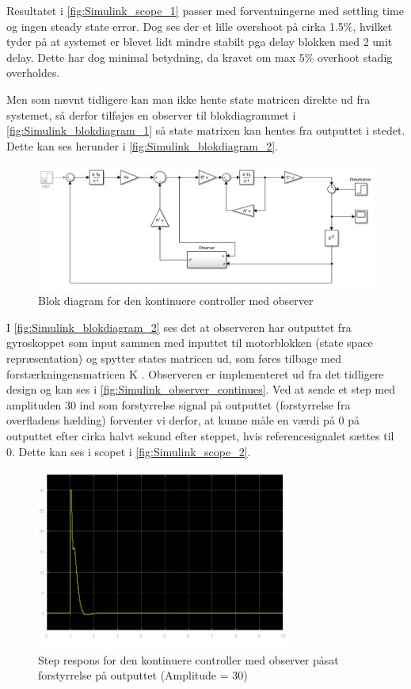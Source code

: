 Resultatet i \autoref{fig:Simulink_scope_1} passer med forventningerne med settling time og ingen steady state error. Dog ses der et lille overshoot på cirka 1.5\%, hvilket tyder på at systemet er blevet lidt mindre stabilt pga delay blokken med 2 unit delay. Dette har dog minimal betydning, da kravet om max 5\% overhoot stadig overholdes.

Men som nævnt tidligere kan man ikke hente state matricen direkte ud fra systemet, så derfor tilføjes en observer til blokdiagrammet i \autoref{fig:Simulink_blokdiagram_1} så state matrixen kan hentes fra outputtet i stedet. Dette kan ses herunder i \autoref{fig:Simulink_blokdiagram_2}.

\begin{figure}[H]
	\centering
	\includegraphics[width = 1\textwidth]{figur/Simulink_blokdiagram_2}
	\caption{Blok diagram for den kontinuere controller med observer}
	\label{fig:Simulink_blokdiagram_2}
\end{figure}
I \autoref{fig:Simulink_blokdiagram_2} ses det at observeren har outputtet fra gyroskoppet som input sammen med inputtet til motorblokken (state space repræsentation) og spytter states matricen ud, som føres tilbage med forstærkningensmatricen K . Observeren er implementeret ud fra det tidligere design og kan ses i \autoref{fig:Simulink_observer_continues}. Ved at sende et step med amplituden 30 ind som forstyrrelse signal på outputtet (forstyrrelse fra overfladens hælding) forventer vi derfor, at kunne måle en værdi på 0 på outputtet efter cirka halvt sekund efter steppet, hvis referencesignalet sættes til 0. Dette kan ses i scopet i \autoref{fig:Simulink_scope_2}.
 
\begin{figure}[H]
	\centering
	\includegraphics[width = 0.75\textwidth]{figur/Simulink_scope_2}
	\caption{Step respons for den kontinuere controller med observer påsat forstyrrelse på outputtet (Amplitude = 30)}
	\label{fig:Simulink_scope_2}
\end{figure}

